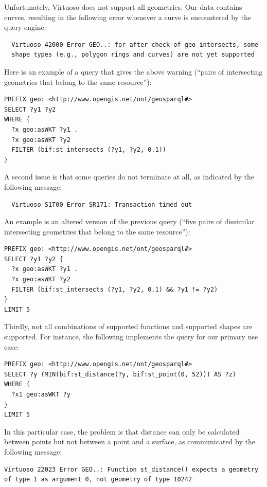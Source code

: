 \documentclass[a4paper]{scrartcl}
\begin{document}
Unfortunately, Virtuoso does not support all geometries.  Our data
contains curves, resulting in the following error whenever a curve is
encountered by the query engine:

\begin{verbatim}
  Virtuoso 42000 Error GEO..: for after check of geo intersects, some
  shape types (e.g., polygon rings and curves) are not yet supported
\end{verbatim}

Here is an example of a query that gives the above warning (``pairs of
intersecting geometries that belong to the same resource''):

\begin{verbatim}
PREFIX geo: <http://www.opengis.net/ont/geosparql#>
SELECT ?y1 ?y2
WHERE {
  ?x geo:asWKT ?y1 .
  ?x geo:asWKT ?y2
  FILTER (bif:st_intersects (?y1, ?y2, 0.1))
}
\end{verbatim}

A second issue is that some queries do not terminate at all, as
indicated by the following message:

\begin{verbatim}
  Virtuoso S1T00 Error SR171: Transaction timed out
\end{verbatim}

An example is an altered version of the previous query (``five pairs
of dissimilar intersecting geometries that belong to the same
resource''):

\begin{verbatim}
PREFIX geo: <http://www.opengis.net/ont/geosparql#>
SELECT ?y1 ?y2 {
  ?x geo:asWKT ?y1 .
  ?x geo:asWKT ?y2
  FILTER (bif:st_intersects (?y1, ?y2, 0.1) && ?y1 != ?y2)
}
LIMIT 5
\end{verbatim}

Thirdly, not all combinations of supported functions and supported
shapes are supported.  For instance, the following implements the
query for our primary use case:

\begin{verbatim}
PREFIX geo: <http://www.opengis.net/ont/geosparql#>
SELECT ?y (MIN(bif:st_distance(?y, bif:st_point(0, 52))) AS ?z)
WHERE {
  ?x1 geo:asWKT ?y
}
LIMIT 5
\end{verbatim}

In this particular case, the problem is that distance can only be
calculated between points but not between a point and a surface, as
communicated by the following message:

\begin{verbatim}
Virtuoso 22023 Error GEO..: Function st_distance() expects a geometry
of type 1 as argument 0, not geometry of type 10242
\end{verbatim}
\end{document}
